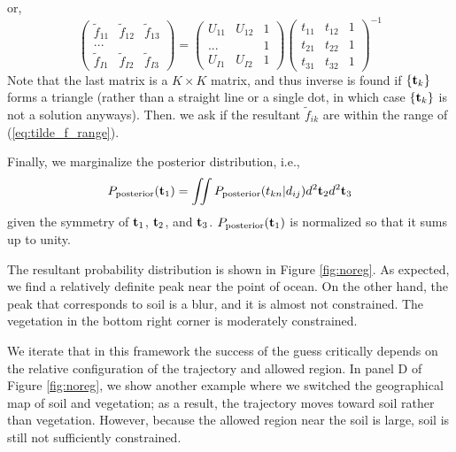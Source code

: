 \documentclass[iop,numberedappendix,apj,]{emulateapj}
\def\fast{\tilde f}
\begin{document}
or,
\begin{equation}
\begin{pmatrix}
\fast_{11} & \fast_{12} & \fast_{13}  \\
... & \\
\fast_{I1} & \fast_{I2} & \fast_{I3}
\end{pmatrix}
=
\begin{pmatrix}
U_{11} & U_{12} & 1 \\
... & & 1 \\
U_{I1} & U_{I2} & 1 
\end{pmatrix}
\begin{pmatrix}
t_{11} & t_{12} & 1 \\
t_{21} & t_{22} & 1 \\
t_{31} & t_{32} & 1 
\end{pmatrix}^{-1}
\label{eq:f=ds-1}
\end{equation}
Note that the last matrix is a $K\times K$ matrix, and thus inverse is found if $\{ {\bf t}_k \}$ forms a triangle (rather than a straight line or a single dot, in which case $\{ {\bf t}_k \}$ is not a solution anyways).
Then. we ask if the resultant $\fast_{ik}$ are within the range of (\ref{eq:tilde_f_range}). 

Finally, we marginalize the posterior distribution, i.e.,
\begin{equation} 
P_{\rm posterior} ( {\bf t}_1) = \iint P_{\rm posterior} ( t_{kn} | d_{ij} ) d^2 {\bf t}_2 d^2 {\bf t}_3
\end{equation}
given the symmetry of ${\bf t}_1$, ${\bf t}_2$, and ${\bf t}_3$. 
$P_{\rm posterior} ( {\bf t}_1) $ is normalized so that it sums up to unity. 

The resultant probability distribution is shown in Figure \ref{fig:noreg}. 
As expected, we find a relatively definite peak near the point of ocean. 
On the other hand, the peak that corresponds to soil is a blur, and it is almost not constrained. 
The vegetation in the bottom right corner is moderately constrained. 

We iterate that in this framework the success of the guess critically depends on the relative configuration of the trajectory and allowed region. 
In panel D of Figure \ref{fig:noreg}, we show another example where we switched the geographical map of soil and vegetation; as a result, the trajectory moves toward soil rather than vegetation. However, because the allowed region near the soil is large, soil is still not sufficiently constrained. 
\end{document}
